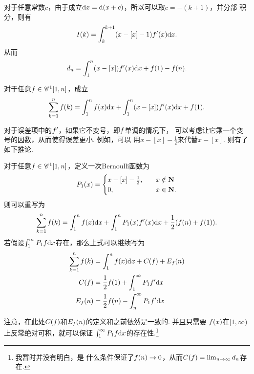     \begin{pos}
      对于任意常数$c$，由于成立$\mathrm{d} x= \mathrm{d}(x+c)$，所以可以取$c=-(k+1)$，并分部
      积分，则有
      \[
        I(k) = \int_{k}^{k+1} (x-[x]-1)\mathnormal{f}^\prime(x)\mathrm{d} x.
      \]
      从而
      \[
        d_n = \int_1^n(x-[x])\mathnormal{f}^\prime(x)\mathrm{d} x + \mathnormal{f}(1) - \mathnormal{f}(n).
      \]
    \end{pos}

    \begin{thm}[一次导数形式的Euler求和公式]
      对于任意$\mathnormal{f}\in\mathscr{C}^1[1,n]$，成立
      \begin{equation}
        \label{equ: 一次导数Euler求和公式}
        \sum_{k=1}^n\mathnormal{f}(k) = \int_1^n\mathnormal{f}(x)\mathrm{d} x +
        \int_1^n(x-[x])\mathnormal{f}^\prime(x)\mathrm{d} x + \mathnormal{f}(1).
      \end{equation}
    \end{thm}
    \remark
      对于误差项中的$\mathnormal{f}^\prime$，如果它不变号，即$\mathnormal{f}$单调的情况下，
      可以考虑让它乘一个变号的因数，从而使得误差更小. 例如，可以
      用$x-[x]-\frac{1}{2}$来代替$x-[x]$. 则有了如下推论.

    \begin{cor}
      \label{cor: 一次Euler求和公式}
      对于任意$\mathnormal{f}\in\mathscr{C}^1[1,n]$，定义一次Bernoulli函数为
      \[
        P_1(x) =
        \begin{cases}
          x - [x] - \frac{1}{2},\quad& x \notin \mathbf{N} \\
          0, & x\in\mathbf{N}.
        \end{cases}
      \]
      则可以重写为
      \begin{equation}
        \sum_{k=1}^n\mathnormal{f}(k) = \int_1^n\mathnormal{f}(x)\mathrm{d} x +
        \int_1^nP_1(x)\mathnormal{f}^\prime(x)\mathrm{d} x + \frac{1}{2}(\mathnormal{f}(n) + \mathnormal{f}(1)).
      \end{equation}
      若假设$\int_1^{\infty}P_1\mathnormal{f}\mathrm{d} x$存在，那么上式可以继续写为
      \[
        \begin{split}
        \sum_{k=1}^n\mathnormal{f}(k) &= \int_1^n\mathnormal{f}(x)\mathrm{d} x + C(\mathnormal{f}) + E_{\mathnormal{f}}(n) \\
        C(\mathnormal{f}) &= \frac{1}{2}\mathnormal{f}(1) + \int_1^{\infty}P_1\mathnormal{f}^\prime\mathrm{d} x\\
        E_{\mathnormal{f}}(n) &= \frac{1}{2}\mathnormal{f}(n) - \int_n^{\infty}P_1\mathnormal{f}^\prime\mathrm{d} x
      \end{split}\]
    \end{cor}
    \remark
      注意，在此处$C(\mathnormal{f})$和$E_{\mathnormal{f}}(n)$的定义和之前依然是一致的. 并且只需要
      $\mathnormal{f}(x)$在$[1, \infty)$上反常绝对可积，就可以保证
      $\int_1^\infty P_1\mathnormal{f}\mathrm{d} x$的存在性.\footnote{我暂时并没有明白，是
      什么条件保证了$\mathnormal{f}(n)\to 0$，从而$C(\mathnormal{f}) = \lim_{n\to\infty}d_n$存在.}

